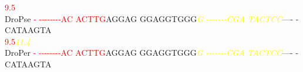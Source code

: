 \documentclass[11pt,twoside,reqno,a4paper]{article}
\begin{document}
{\hspace*{7\charwidth}\hspace*{0\charwidth}\textcolor{Red}{9.5}\hspace*{1\charwidth}\hspace*{1\charwidth}\hspace*{1\charwidth}\hspace*{1\charwidth}\hspace*{1\charwidth}\hspace*{1\charwidth}\\
DroPse	\textcolor{Red}{-}	\textcolor{Red}{-}\textcolor{Red}{-}\textcolor{Red}{-}\textcolor{Red}{-}\textcolor{Red}{-}\textcolor{Red}{-}\textcolor{Red}{-}\textcolor{Red}{-}\textcolor{Red}{A}\textcolor{Red}{C}	\textcolor{Red}{A}\textcolor{Red}{C}\textcolor{Red}{T}\textcolor{Red}{T}\textcolor{Red}{G}AGGAG	GGAGGTGGG\textit{\textcolor{Yellow}{G}}	\textit{\textcolor{Yellow}{-}}\textit{\textcolor{Yellow}{-}}\textit{\textcolor{Yellow}{-}}\textit{\textcolor{Yellow}{-}}\textit{\textcolor{Yellow}{-}}\textit{\textcolor{Yellow}{-}}\textit{\textcolor{Yellow}{-}}\textit{\textcolor{Yellow}{C}}\textit{\textcolor{Yellow}{G}}\textit{\textcolor{Yellow}{A}}	\textit{\textcolor{Yellow}{T}}\textit{\textcolor{Yellow}{A}}\textit{\textcolor{Yellow}{C}}\textit{\textcolor{Yellow}{T}}\textit{\textcolor{Yellow}{C}}\textit{\textcolor{Yellow}{C}}----	-CATAAGTA\\
\hspace*{7\charwidth}\hspace*{0\charwidth}\textcolor{Red}{9.5}\hspace*{1\charwidth}\hspace*{1\charwidth}\hspace*{1\charwidth}\hspace*{27\charwidth}\textit{\textcolor{Yellow}{11.4}}\hspace*{1\charwidth}\hspace*{1\charwidth}\hspace*{1\charwidth}\\
DroPer	\textcolor{Red}{-}	\textcolor{Red}{-}\textcolor{Red}{-}\textcolor{Red}{-}\textcolor{Red}{-}\textcolor{Red}{-}\textcolor{Red}{-}\textcolor{Red}{-}\textcolor{Red}{-}\textcolor{Red}{A}\textcolor{Red}{C}	\textcolor{Red}{A}\textcolor{Red}{C}\textcolor{Red}{T}\textcolor{Red}{T}\textcolor{Red}{G}AGGAG	GGAGGTGGG\textit{\textcolor{Yellow}{G}}	\textit{\textcolor{Yellow}{-}}\textit{\textcolor{Yellow}{-}}\textit{\textcolor{Yellow}{-}}\textit{\textcolor{Yellow}{-}}\textit{\textcolor{Yellow}{-}}\textit{\textcolor{Yellow}{-}}\textit{\textcolor{Yellow}{-}}\textit{\textcolor{Yellow}{C}}\textit{\textcolor{Yellow}{G}}\textit{\textcolor{Yellow}{A}}	\textit{\textcolor{Yellow}{T}}\textit{\textcolor{Yellow}{A}}\textit{\textcolor{Yellow}{C}}\textit{\textcolor{Yellow}{T}}\textit{\textcolor{Yellow}{C}}\textit{\textcolor{Yellow}{C}}----	-CATAAGTA\\
}
\end{document}
